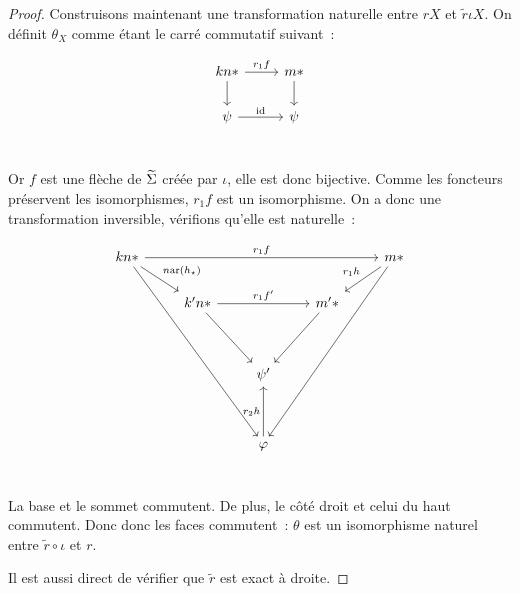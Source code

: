 \begin{proof}
    Construisons maintenant une transformation naturelle entre $rX$ et
    $\tilde{r}\iota X$. On définit $\theta_X$ comme étant le carré commutatif
    suivant~:

    \[\begin{tikzcd}
        kn\ast\arrow[r, "r_1f"]\arrow[d] & m\ast\arrow[d] \\
        \psi\arrow[r, "\id"] & \psi \\
    \end{tikzcd}\]

    Or $f$ est une flèche de $\widetilde{\Sigma}$ créée par $\iota$, elle est donc bijective. Comme
    les foncteurs préservent les isomorphismes, $r_1f$ est un isomorphisme. On a donc
    une transformation inversible, vérifions qu'elle est naturelle~:

    \[\begin{tikzcd}
        kn\ast\arrow[rrrr, "r_1f"]\arrow[dr, "n\arf(h_\star)"]\arrow[dddddrr]
            & & & & m\ast\arrow[dl, swap, "r_1h"]\arrow[dddddll] \\
        & k'n\ast\arrow[rr, "r_1f'"]\arrow[ddr]
            & & m'\ast\arrow[ddl] & \\
        & & & & \\
        & & \psi' & & \\
        & & & & \\
        & & \phi\arrow[uu, "r_2h"] & & \\
    \end{tikzcd}\]

    La base et le sommet commutent. De plus, le côté droit et celui du haut commutent.
    Donc donc les faces commutent~: $\theta$ est un isomorphisme naturel entre
    $\tilde{r}\circ\iota$ et $r$.

    Il est aussi direct de vérifier que $\tilde{r}$ est exact à droite.
\end{proof}


